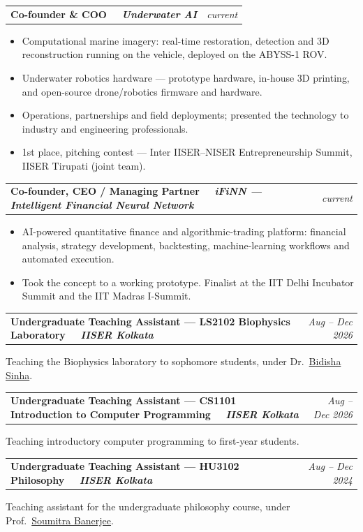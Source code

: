 \documentclass[10pt,a4paper]{article}
\makeatletter
\newcommand{\org}[1]{\ \textnormal{\itshape #1}}
\newcommand{\cvsection}[1]{%
  \par\vspace{9pt}%
  \noindent{\large\scshape\bfseries #1}\par
  \vspace{1pt}%
  \noindent{\color{rule}\rule{\textwidth}{0.45pt}}\par
  \vspace{2.5pt}%
}
\newcommand{\cventry}[3]{%
  \par\vspace{3pt}%
  \noindent
  \begin{tabularx}{\textwidth}{@{}>{\raggedright\arraybackslash}X@{\hspace{10pt}}>{\raggedleft\arraybackslash\small\itshape}r@{}}
    \textbf{#1} & #2 \\
  \end{tabularx}%
  \par\vspace{-2pt}%
  #3\par
}
\makeatother
\begin{document}
\cvsection{Entrepreneurship \& Product}
\cventry{Co-founder \& COO \org{\textperiodcentered\ Underwater AI}}{current}{%
  \begin{itemize}
    \item Computational marine imagery: real-time restoration, detection and 3D reconstruction running on the vehicle, deployed on the ABYSS-1 ROV.
    \item Underwater robotics hardware --- prototype hardware, in-house 3D printing, and open-source drone/robotics firmware and hardware.
    \item Operations, partnerships and field deployments; presented the technology to industry and engineering professionals.
    \item 1st place, pitching contest --- Inter IISER--NISER Entrepreneurship Summit, IISER Tirupati (joint team).
  \end{itemize}}
\cventry{Co-founder, CEO / Managing Partner \org{\textperiodcentered\ iFiNN --- Intelligent Financial Neural Network}}{current}{%
  \begin{itemize}
    \item AI-powered quantitative finance and algorithmic-trading platform: financial analysis, strategy development, backtesting, machine-learning workflows and automated execution.
    \item Took the concept to a working prototype. Finalist at the IIT Delhi Incubator Summit and the IIT Madras I-Summit.
  \end{itemize}}

\cvsection{Teaching}
\cventry{Undergraduate Teaching Assistant --- LS2102 Biophysics Laboratory \org{\textperiodcentered\ IISER Kolkata}}{Aug -- Dec 2026}{Teaching the Biophysics laboratory to sophomore students, under Dr.\ \href{https://www.iiserkol.ac.in/web/faculty-details/bidisha-sinha}{Bidisha Sinha}.}
\cventry{Undergraduate Teaching Assistant --- CS1101 Introduction to Computer Programming \org{\textperiodcentered\ IISER Kolkata}}{Aug -- Dec 2026}{Teaching introductory computer programming to first-year students.}
\cventry{Undergraduate Teaching Assistant --- HU3102 Philosophy \org{\textperiodcentered\ IISER Kolkata}}{Aug -- Dec 2024}{Teaching assistant for the undergraduate philosophy course, under Prof.\ \href{https://physics.iiserkol.ac.in/fac_hompage.php?did=R3VEZHFMcmdTdXlkcGcwNU1kYXhwYysxUTBnQ2l0U0pZUmZLdTUrMk9PMD0=}{Soumitra Banerjee}.}
\end{document}
